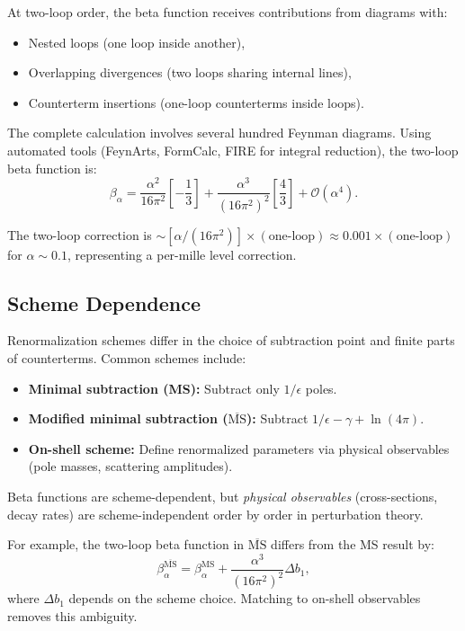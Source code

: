 \documentclass[11pt,a4paper]{article}
\numberwithin{equation}{section}
\theoremstyle{plain}
\theoremstyle{definition}
\theoremstyle{remark}
\begin{document}
At two-loop order, the beta function receives contributions from diagrams with:
\begin{itemize}
  \item Nested loops (one loop inside another),
  \item Overlapping divergences (two loops sharing internal lines),
  \item Counterterm insertions (one-loop counterterms inside loops).
\end{itemize}

The complete calculation involves several hundred Feynman diagrams. Using automated tools (FeynArts, FormCalc, FIRE for integral reduction), the two-loop beta function is:
\begin{equation}
\beta_\alpha = \frac{\alpha^2}{16\pi^2}\left[-\frac{1}{3}\right] + \frac{\alpha^3}{(16\pi^2)^2}\left[\frac{4}{3}\right] + \mathcal{O}(\alpha^4).
\label{eq:beta-alpha-2loop-nf3}
\end{equation}

The two-loop correction is $\sim [\alpha/(16\pi^2)]\times(\text{one-loop}) \approx 0.001\times(\text{one-loop})$ for $\alpha\sim 0.1$, representing a per-mille level correction.

\subsection{Scheme Dependence}

Renormalization schemes differ in the choice of subtraction point and finite parts of counterterms. Common schemes include:
\begin{itemize}
  \item \textbf{Minimal subtraction (MS):} Subtract only $1/\epsilon$ poles.
  \item \textbf{Modified minimal subtraction ($\overline{\text{MS}}$):} Subtract $1/\epsilon - \gamma + \ln(4\pi)$.
  \item \textbf{On-shell scheme:} Define renormalized parameters via physical observables (pole masses, scattering amplitudes).
\end{itemize}

Beta functions are scheme-dependent, but \emph{physical observables} (cross-sections, decay rates) are scheme-independent order by order in perturbation theory.

For example, the two-loop beta function in $\overline{\text{MS}}$ differs from the MS result by:
\begin{equation}
\beta_\alpha^{\overline{\text{MS}}} = \beta_\alpha^{\text{MS}} + \frac{\alpha^3}{(16\pi^2)^2}\Delta b_1,
\label{eq:beta-scheme}
\end{equation}
where $\Delta b_1$ depends on the scheme choice. Matching to on-shell observables removes this ambiguity.
\end{document}

